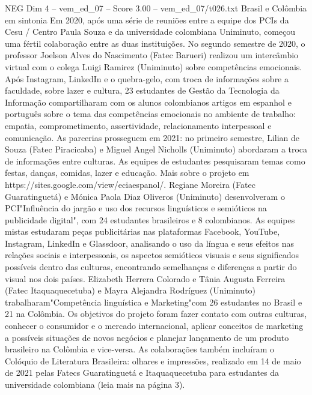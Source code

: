 \begin{textsample}{NEG Dim 4 – vem\_ed\_07 – Score 3.00 – vem\_ed\_07/t026.txt}  \label{ex:f4_neg_126}
Brasil e Colômbia em sintonia Em 2020, após uma série de reuniões entre a equipe dos PCIs da Cesu / Centro Paula Souza e da universidade colombiana Uniminuto, começou uma fértil colaboração entre as duas instituições.
No segundo semestre de 2020, o professor Joelson Alves do Nascimento (Fatec Barueri) realizou um intercâmbio virtual com o colega Luigi Ramirez (Uniminuto) sobre competências emocionais.
Após Instagram, LinkedIn e o quebra-gelo, com troca de informações sobre a faculdade, sobre lazer e cultura, 23 estudantes de Gestão da Tecnologia da Informação compartilharam com os alunos colombianos artigos em espanhol e português sobre o tema das competências emocionais no ambiente de trabalho: empatia, comprometimento, assertividade, relacionamento interpessoal e comunicação.
As parcerias prosseguem em 2021: no primeiro semestre, Lilian de Souza (Fatec Piracicaba) e Miguel Angel Nicholls (Uniminuto) abordaram a troca de informações entre culturas.
As equipes de estudantes pesquisaram temas como festas, danças, comidas, lazer e educação.
Mais sobre o projeto em https://sites.google.com/view/eciaespanol/.
Regiane Moreira (Fatec Guaratinguetá) e Mónica Paola Diaz Oliveros (Uniminuto) desenvolveram o PCI"Influência do jargão e uso dos recursos linguísticos e semióticos na publicidade digital", com 24 estudantes brasileiros e 8 colombianos.
As equipes mistas estudaram peças publicitárias nas plataformas Facebook, YouTube, Instagram, LinkedIn e Glassdoor, analisando o uso da língua e seus efeitos nas relações sociais e interpessoais, os aspectos semióticos visuais e seus significados possíveis dentro das culturas, encontrando semelhanças e diferenças a partir do visual nos dois países.
Elizabeth Herrera Colorado e Tânia Augusta Ferreira (Fatec Itaquaquecetuba) e Mayra Alejandra Rodríguez (Uniminuto) trabalharam"Competência linguística e Marketing"com 26 estudantes no Brasil e 21 na Colômbia.
Os objetivos do projeto foram fazer contato com outras culturas, conhecer o consumidor e o mercado internacional, aplicar conceitos de marketing a possíveis situações de novos negócios e planejar lançamento de um produto brasileiro na Colômbia e vice-versa.
As colaborações também incluíram o Colóquio de Literatura Brasileira: olhares e impressões, realizado em 14 de maio de 2021 pelas Fatecs Guaratinguetá e Itaquaquecetuba para estudantes da universidade colombiana (leia mais na página 3).

\end{textsample}
